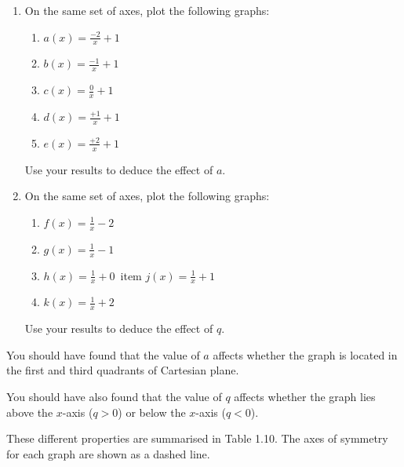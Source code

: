 \begin{enumerate}[noitemsep, label=\textbf{\arabic*}. ] 
\item On the same set of axes, plot the following graphs:
    \begin{enumerate}[noitemsep, label=\textbf{\alph*}. ] 
    \item $a(x)=\frac{-2}{x}+1$
    \item $b(x)=\frac{-1}{x}+1$
    \item $c(x)=\frac{0}{x}+1$
    \item $d(x)=\frac{+1}{x}+1$
    \item $e(x)=\frac{+2}{x}+1$
    \end{enumerate}
Use your results to deduce the effect of $a$.
\item On the same set of axes, plot the following graphs:
    \begin{enumerate}[noitemsep, label=\textbf{\alph*}. ] 
    \item $f(x)=\frac{1}{x}-2$
    \item $g(x)=\frac{1}{x}-1$
    \item $h(x)=\frac{1}{x}+0$\
    item $j(x)=\frac{1}{x}+1$
    \item $k(x)=\frac{1}{x}+2$\end{enumerate}
Use your results to deduce the effect of $q$.
\end{enumerate}
You should have found that the value of $a$ affects whether the graph is located in the first and third quadrants of Cartesian plane.\par 
You should have also found that the value of $q$ affects whether the graph lies above the $x$-axis ($q>0$) or below the $x$-axis ($q<0$).\par 
These different properties are summarised in Table 1.10. The axes of symmetry for each graph are shown as a dashed line.\par 
